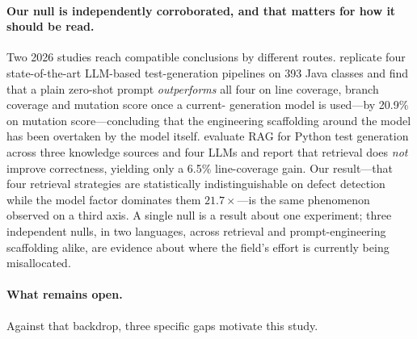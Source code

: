 \documentclass[smallextended]{svjour3}
\begin{document}
\paragraph{Our null is independently corroborated, and that matters
for how it should be read.}
Two 2026 studies reach compatible conclusions by different routes.
\citet{konstantinou2026newer} replicate four state-of-the-art
LLM-based test-generation pipelines on 393 Java classes and find
that a plain zero-shot prompt \emph{outperforms} all four on line
coverage, branch coverage and mutation score once a current-
generation model is used---by 20.9\% on mutation score---concluding
that the engineering scaffolding around the model has been overtaken
by the model itself. \citet{shin2026ragtest} evaluate RAG for Python
test generation across three knowledge sources and four LLMs and
report that retrieval does \emph{not} improve correctness, yielding
only a 6.5\% line-coverage gain. Our result---that four retrieval
strategies are statistically indistinguishable on defect detection
while the model factor dominates them $21.7\times$---is the same
phenomenon observed on a third axis. A single null is a result about
one experiment; three independent nulls, in two languages, across
retrieval and prompt-engineering scaffolding alike, are evidence
about where the field's effort is currently being misallocated.

\paragraph{What remains open.}
Against that backdrop, three specific gaps motivate this study.
\end{document}
